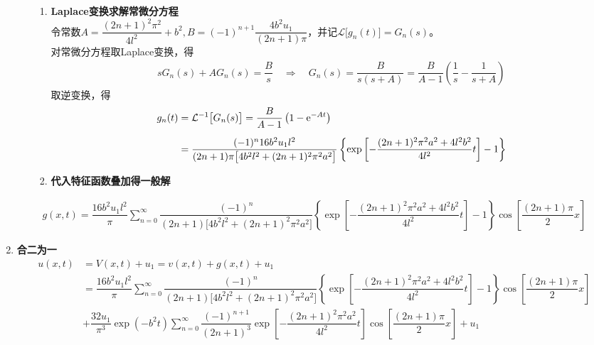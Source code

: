 \begin{enumerate}[{\textbf{步骤}}1 ]
\begin{itemize}
\begin{enumerate}[\textbf{步骤} 1 ]
			\item \textbf{Laplace变换求解常微分方程}\\[0.5em]
			令常数$A = \dfrac{(2n+1)^2\pi^2}{4l^2} + b^2, B = (-1)^{n+1} \dfrac{4 b^2 u_1}{(2n+1) \pi}$，并记$\mathcal{L}\big[g_n(t)\big] = G_n(s)$。\\[0.5em]
			对常微分方程取Laplace变换，得
			\begin{align}
				s G_n(s) + A G_n(s) = \dfrac{B}{s} \quad \Rightarrow \quad G_n(s) = \dfrac{B}{s(s + A)} = \dfrac{B}{A - 1} \left(\dfrac{1}{s} - \dfrac{1}{s + A}\right)
			\end{align}
			取逆变换，得
			\begin{align}
				g_n(t) &= \mathcal{L}^{-1}\big[G_n(s)\big] = \dfrac{B}{A-1}\left(1 - {\rm{e}}^{-At}\right) \notag \\[0.5em]
				& = \dfrac{(-1)^n 16b^2 u_1l^2}{(2n+1)\pi \big[4b^2l^2 + (2n + 1)^2\pi^2 a^2\big]}\left\{ \exp \left[- \dfrac{(2n+1)^2\pi^2a^2 + 4l^2b^2}{4l^2} t\right] - 1\right\}
			\end{align}
		
			\item \textbf{代入特征函数叠加得一般解}
		\end{enumerate}
	\end{itemize}
	\vspace*{-0.5em}
	\begin{align}
		g(x,t) = \dfrac{16b^2 u_1l^2}{\pi}\sum_{n = 0}^{\infty} \dfrac{(-1)^n}{(2n+1) \big[4b^2l^2 + (2n + 1)^2\pi^2 a^2\big]}\left\{ \exp \left[- \dfrac{(2n+1)^2\pi^2a^2 + 4l^2b^2}{4l^2} t\right] - 1\right\}\cos \left[\dfrac{(2n+1)\pi}{2} x\right]
	\end{align}
	
	\item \textbf{合二为一}
	\begin{equation}
		\begin{split}
			u(x, t) &= V(x, t) + u_1 = v(x, t) + g(x, t) + u_1\\[0.5em]
			& =  \dfrac{16b^2 u_1l^2}{\pi}\sum_{n = 0}^{\infty} \dfrac{(-1)^n}{(2n+1) \big[4b^2l^2 + (2n + 1)^2\pi^2 a^2\big]}\left\{ \exp \left[- \dfrac{(2n+1)^2\pi^2a^2 + 4l^2b^2}{4l^2} t\right] - 1\right\}\cos \left[\dfrac{(2n+1)\pi}{2} x\right] \\[0.5em]
			& + \dfrac{32 u_1}{\pi^3} \exp(-b^2 t) \sum_{n = 0}^{\infty} \dfrac{(-1)^{n+1}}{(2n+1)^3} \exp \left[- \dfrac{(2n+1)^2\pi^2 a^2}{4l^2} t\right] \cos \left[ \dfrac{(2n+1)\pi}{2} x\right] + u_1
		\end{split}
	\end{equation}
\end{enumerate}

